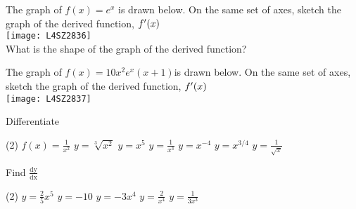 \begin{Exercise}[title={Rate of Change},label=exRateOfChange]
\begin{Exercise}[title={Differentiation from First Principles},label=exFirstPrinciples]
\Question The graph of $f (x) =e^{x}$ is drawn below. On the same set of axes, sketch the graph of the derived function, $f^{ \prime } (x)\vspace{+0.500000cm}$ \\
\texttt{[image: L4SZ2836]}\\
What is the shape of the graph of the derived function?
	
\Question The graph of $f (x) =10 x^{2} e^{x} (x +1)$is drawn below. On the same set of axes, sketch the graph of the derived function, $f^{ \prime } (x)\vspace{+0.500000cm}$ \\
\texttt{[image: L4SZ2837]}%

	\Question Differentiate
\begin{tasks}(2)
	\task  $f (x) =\frac{1}{x^{2}}$ %
	\task $y =\sqrt[{3}]{x^{2}}$ %
	\task $y =x^{5}$ %
	\task $y =\frac{1}{x^{3}}$ %
	\task $y =x^{ -4}$ %
	\task $y =x^{3/4}$ %
	\task $y =\frac{1}{\sqrt{x}}$ %

	
\end{tasks}

\end{Exercise}
\begin{Answer}[ref={exFirstPrinciples}]

\end{Answer}%

\begin{Exercise}[title={Standard Derivatives},label=exStandardDerivatives]
	\Question Find $\frac{\text{dy}}{\text{dx}}$
	\begin{tasks}(2)
		\task $y =\frac{2}{5} x^{5}$ %
		\task $y = -10$ %
		\task $y = -3 x^{4}$ %
		\task $y =\frac{2}{x^{4}}$ %
		\task $y =\frac{1}{3 x^{3}}$ %
	\end{tasks}
	

\end{Exercise}
\end{Exercise}
